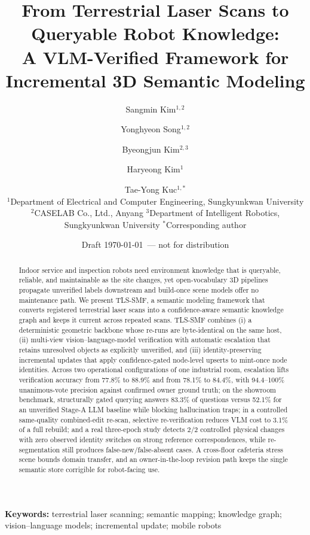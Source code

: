 \documentclass[10pt,a4paper]{article}
\title{From Terrestrial Laser Scans to Queryable Robot Knowledge:\\
A VLM-Verified Framework for Incremental 3D Semantic Modeling}
\author{Sangmin Kim$^{1,2}$ \and Yonghyeon Song$^{1,2}$ \and
Byeongjun Kim$^{2,3}$ \and Haryeong Kim$^{1}$ \and
Tae-Yong Kuc$^{1,*}$\\[2pt]
\small $^1$Department of Electrical and Computer Engineering, Sungkyunkwan University\\
\small $^2$CASELAB Co., Ltd., Anyang \quad
$^3$Department of Intelligent Robotics, Sungkyunkwan University \quad
$^*$Corresponding author}
\date{Draft \today\ --- not for distribution}
\begin{document}
\maketitle

\begin{abstract}
Indoor service and inspection robots need environment knowledge that is
queryable, reliable, and maintainable as the site changes, yet
open-vocabulary 3D pipelines propagate unverified labels downstream and
build-once scene models offer no maintenance path. We present TLS-SMF, a
semantic modeling framework that converts registered terrestrial laser
scans into a confidence-aware semantic knowledge graph and keeps it
current across repeated scans. TLS-SMF combines (i) a deterministic
geometric backbone whose re-runs are byte-identical on the same host,
(ii) multi-view vision--language-model verification with automatic
escalation that retains unresolved objects as explicitly unverified, and
(iii) identity-preserving incremental updates that apply confidence-gated
node-level upserts to mint-once node identities. Across two operational
configurations of one industrial room, escalation lifts verification
accuracy from 77.8\% to 88.9\% and from 78.1\% to 84.4\%, with
94.4--100\% unanimous-vote precision against confirmed owner ground
truth; on the showroom benchmark, structurally gated querying answers
83.3\% of questions versus 52.1\% for an unverified Stage-A LLM baseline
while blocking hallucination traps; in a controlled same-quality
combined-edit re-scan, selective re-verification reduces VLM cost to
3.1\% of a full rebuild; and a real three-epoch study detects 2/2
controlled physical changes with zero observed identity switches on
strong reference correspondences, while re-segmentation still produces
false-new/false-absent cases. A cross-floor cafeteria stress
scene bounds domain transfer, and an owner-in-the-loop revision path
keeps the single semantic store corrigible for robot-facing use.
\end{abstract}

\textbf{Keywords:} terrestrial laser scanning; semantic mapping; knowledge
graph; vision--language models; incremental update; mobile robots












\end{document}
